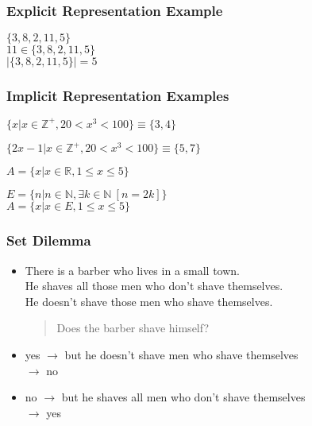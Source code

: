 \documentclass[dvipsnames]{beamer}
\begin{document}
\begin{frame}
  \frametitle{Explicit Representation Example}

  \begin{example}
    $\{3,8,2,11,5\}$\\
    $11 \in \{3,8,2,11,5\}$\\
    $|\{3,8,2,11,5\}|=5$
  \end{example}
\end{frame}

\begin{frame}
  \frametitle{Implicit Representation Examples}

  \begin{example}
    $\{x | x \in \mathbb{Z}^+, 20 < x^3 < 100\} \equiv \{3,4\}$

    $\{2x-1 | x \in \mathbb{Z}^+, 20 < x^3 < 100\} \equiv \{5,7\}$
  \end{example}

  \pause
  \begin{example}
    $A = \{ x | x \in \mathbb{R}, 1 \leq x \leq 5 \}$
  \end{example}

  \pause
  \begin{example}
    $E = \{ n | n \in \mathbb{N}, \exists k \in \mathbb{N}~[n=2k] \}$\\
    $A = \{ x | x \in E, 1 \leq x \leq 5 \}$
  \end{example}
\end{frame}

\begin{frame}
  \frametitle{Set Dilemma}

  \begin{itemize}
    \item There is a barber who lives in a small town.\\
      He shaves all those men who don't shave themselves.\\
      He doesn't shave those men who shave themselves.

    \begin{quote}
      Does the barber shave himself?
    \end{quote}

    \pause
    \item yes $\rightarrow$ but he doesn't shave men who shave themselves\\
      $\rightarrow$ no

    \pause
    \item no $\rightarrow$ but he shaves all men who don't shave themselves\\
      $\rightarrow$ yes
  \end{itemize}
\end{frame}
\end{document}
